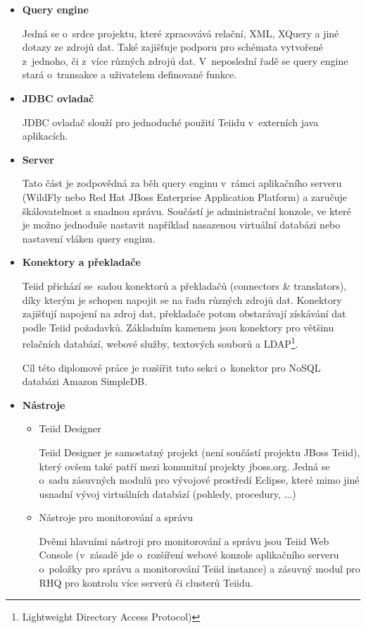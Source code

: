 \documentclass[oneside,12pt]{fithesis2}
\begin{document}
\begin{itemize}
 \item \textbf{Query engine}
 
 Jedná se o~srdce projektu, které zpracovává relační, XML, XQuery a jiné dotazy ze zdrojů dat. Také zajišťuje podporu pro schémata vytvořené z~jednoho, či z~více různých zdrojů dat. V~neposlední řadě se query engine stará o~transakce a uživatelem definované funkce.
 
 \item \textbf{JDBC ovladač}
 
 JDBC ovladač slouží pro jednoduché použití Teiidu v~externích java aplikacích.
 
 \item \textbf{Server}
 
 Tato část je zodpovědná za běh query enginu v~rámci aplikačního serveru (WildFly nebo Red Hat JBoss Enterprise Application Platform) a zaručuje škálovatelnost a snadnou správu. Součástí je administrační konzole, ve které je možno jednoduše nastavit například nasazenou virtuální databázi nebo nastavení vláken query enginu.

 \item \textbf{Konektory a překladače}

 Teiid přichází se~sadou konektorů a překladačů (connectors \& translators), díky kterým je schopen napojit se na řadu různých zdrojů dat. Konektory zajišťují napojení na zdroj dat, překladače potom obstarávají získávání dat podle Teiid požadavků. Základním kamenem jsou konektory pro většinu relačních databází, webové služby, textových souborů a LDAP\footnote{Lightweight Directory Access Protocol)}.
 
 Cíl této diplomové práce je rozšířit tuto sekci o~konektor pro NoSQL databázi Amazon SimpleDB.
 
 \item \textbf{Nástroje}
 
  \begin{itemize}
  \item Teiid Designer
  
  Teiid Designer je samostatný projekt (není součástí projektu JBoss Teiid), který ovšem také patří mezi komunitní projekty jboss.org. Jedná se o~sadu zásuvných modulů pro vývojové prostředí Eclipse, které mimo jiné usnadní vývoj virtuálních databází (pohledy, procedury, ...)
  
  \item Nástroje pro monitorování a správu
  
  Dvěmi hlavními nástroji pro monitorování a správu jsou Teiid Web Console (v~zásadě jde o~rozšíření webové konzole aplikačního serveru o~položky pro správu a monitorování Teiid instance) a zásuvný modul pro RHQ pro kontrolu více serverů či clusterů Teiidu.
  

\end{itemize}
\end{itemize}
\end{document}

